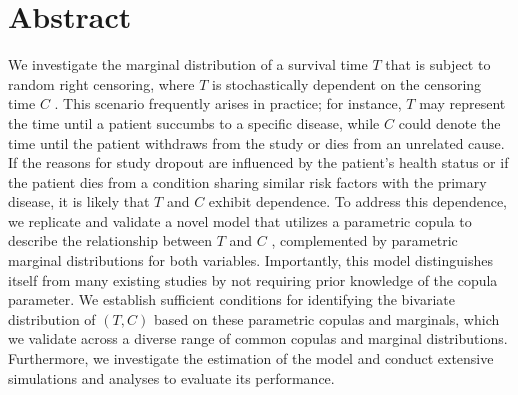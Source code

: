 \section*{Abstract}
\vspace{1pt}
\normalsize{
We investigate the marginal distribution of a survival time  $T$  that is subject to random right censoring, where  $T$  is stochastically dependent on the censoring time  $C$ . This scenario frequently arises in practice; for instance,  $T$  may represent the time until a patient succumbs to a specific disease, while  $C$  could denote the time until the patient withdraws from the study or dies from an unrelated cause. If the reasons for study dropout are influenced by the patient’s health status or if the patient dies from a condition sharing similar risk factors with the primary disease, it is likely that  $T$  and  $C$  exhibit dependence.
To address this dependence, we replicate and validate a novel model\cite{10.1093/biomet/asac067} that utilizes a parametric copula to describe the relationship between  $T$  and  $C$ , complemented by parametric marginal distributions for both variables. Importantly, this model distinguishes itself from many existing studies by not requiring prior knowledge of the copula parameter. We establish sufficient conditions for identifying the bivariate distribution of  $(T, C)$  based on these parametric copulas and marginals, which we validate across a diverse range of common copulas and marginal distributions. Furthermore, we investigate the estimation of the model and conduct extensive simulations and analyses to evaluate its performance.
}\\

